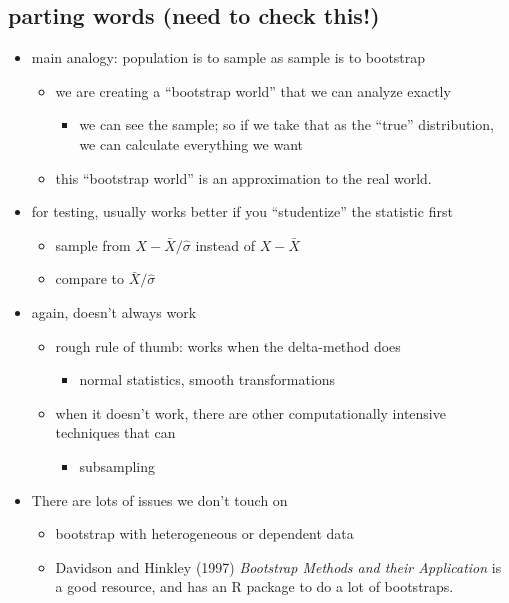 \documentclass[11pt]{article}
\begin{document}
\subsection{parting words (need to check this!)}
\label{sec-2-3}

\begin{itemize}
\item main analogy: population is to sample as sample is to bootstrap
\begin{itemize}
\item we are creating a ``bootstrap world'' that we can analyze
         exactly
\begin{itemize}
\item we can see the sample; so if we take that as the ``true''
           distribution, we can calculate everything we want
\end{itemize}
\item this ``bootstrap world'' is an approximation to the real world.
\end{itemize}
\item for testing, usually works better if you ``studentize'' the
       statistic first
\begin{itemize}
\item sample from $X - \bar X / \hat\sigma$ instead of $X - \bar X$
\item compare to $\bar X / \hat\sigma$
\end{itemize}
\item again, doesn't always work
\begin{itemize}
\item rough rule of thumb: works when the delta-method does
\begin{itemize}
\item normal statistics, smooth transformations
\end{itemize}
\item when it doesn't work, there are other computationally
         intensive techniques that can
\begin{itemize}
\item subsampling
\end{itemize}
\end{itemize}
\item There are lots of issues we don't touch on
\begin{itemize}
\item bootstrap with heterogeneous or dependent data
\item Davidson and Hinkley (1997) \emph{Bootstrap Methods and their          Application} is a good resource, and has an R package to do a
         lot of bootstraps.
\end{itemize}
\end{itemize}
\end{document}
